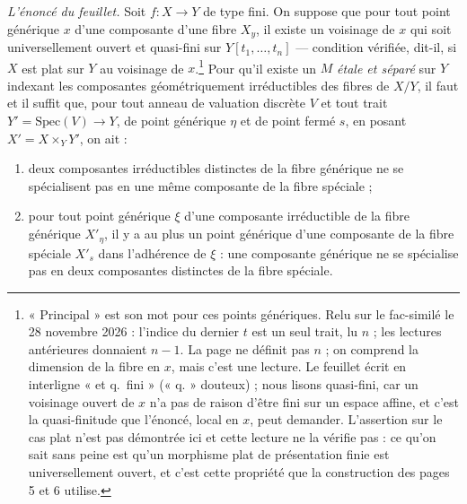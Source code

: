 \documentclass[11pt,a4paper]{article}
\begin{document}
\emph{L'énoncé du feuillet.} Soit $f : X \to Y$ de type fini. On suppose que
pour tout point générique $x$ d'une composante d'une fibre $X_y$, il existe un
voisinage de $x$ qui soit universellement ouvert et quasi-fini sur
$Y[t_1, \ldots, t_n]$ --- condition vérifiée, dit-il, si $X$ est plat sur
$Y$ au voisinage de $x$.\footnote{« Principal » est son mot pour ces points
génériques. Relu sur le fac-similé le 28 novembre 2026 : l'indice du dernier $t$ est
un seul trait, lu $n$ ; les lectures antérieures donnaient $n - 1$. La page ne
définit pas $n$ ; on comprend la dimension de la fibre en $x$, mais c'est une
lecture. Le feuillet écrit en interligne « et q.\ fini » (« q. » douteux) ;
nous lisons quasi-fini, car un
voisinage ouvert de $x$ n'a pas de raison d'être fini sur un espace affine, et
c'est la quasi-finitude que l'énoncé, local en $x$, peut demander. L'assertion sur le cas plat n'est pas démontrée ici et cette lecture ne
la vérifie pas : ce qu'on sait sans peine est qu'un morphisme plat de
présentation finie est universellement ouvert, et c'est cette propriété que
la construction des pages 5 et 6 utilise.} Pour qu'il existe un $M$
\emph{étale et séparé} sur $Y$ indexant les composantes géométriquement
irréductibles des fibres de $X/Y$, il faut et il suffit que, pour tout anneau de valuation discrète $V$ et tout
trait $Y' = \mathrm{Spec}(V) \to Y$, de point générique $\eta$ et de point
fermé $s$, en posant $X' = X \times_Y Y'$, on ait :

\begin{enumerate}
\item[(i)] deux composantes irréductibles distinctes de la fibre générique ne
se spécialisent pas en une même composante de la fibre spéciale ;
\item[(ii)] pour tout point générique $\xi$ d'une composante irréductible de la
fibre générique $X'_{\eta}$, il y a au plus un point générique d'une
composante de la fibre spéciale $X'_s$ dans l'adhérence de $\xi$ : une
composante générique ne se spécialise pas en deux composantes distinctes de la
fibre spéciale.
\end{enumerate}
\end{document}
